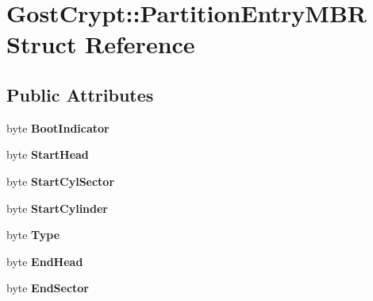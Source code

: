 \hypertarget{struct_gost_crypt_1_1_partition_entry_m_b_r}{}\section{Gost\+Crypt\+:\+:Partition\+Entry\+M\+BR Struct Reference}
\label{struct_gost_crypt_1_1_partition_entry_m_b_r}
\subsection*{Public Attributes}
\begin{DoxyCompactItemize}
\item 
\mbox{\label{struct_gost_crypt_1_1_partition_entry_m_b_r_af0315b21d805e5306e7a555aba71003a}} 
byte {\bfseries Boot\+Indicator}
\item 
\mbox{\label{struct_gost_crypt_1_1_partition_entry_m_b_r_a1b4dc99bf0572207c35b0d3a2046214e}} 
byte {\bfseries Start\+Head}
\item 
\mbox{\label{struct_gost_crypt_1_1_partition_entry_m_b_r_a2236e234a78c88fe8bd7563a05f1384e}} 
byte {\bfseries Start\+Cyl\+Sector}
\item 
\mbox{\label{struct_gost_crypt_1_1_partition_entry_m_b_r_a978032fe5a19ab3bdeead20cf8ab0d87}} 
byte {\bfseries Start\+Cylinder}
\item 
\mbox{\label{struct_gost_crypt_1_1_partition_entry_m_b_r_ac3a641073592a89df37a15ce09a8e921}} 
byte {\bfseries Type}
\item 
\mbox{\label{struct_gost_crypt_1_1_partition_entry_m_b_r_ace245189eda5379c9bdfacf51e3d4c30}} 
byte {\bfseries End\+Head}
\item 
\mbox{\label{struct_gost_crypt_1_1_partition_entry_m_b_r_a4bbec94252c14abb1ec4be4348338301}} 
byte {\bfseries End\+Sector}
\item 
\mbox{\label{struct_gost_crypt_1_1_partition_entry_m_b_r_a7311ad978f978e913814fe5016dbd8c5}} 

\end{DoxyCompactItemize}
